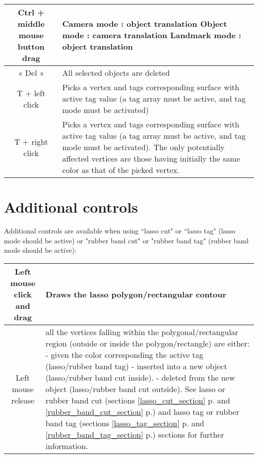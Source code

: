 \begin{tabularx}{\linewidth}{ | c | X | }
Ctrl + middle mouse button drag 
& Camera mode : object translation\newline
Object mode : camera translation\newline
Landmark mode : object translation \\ \hline			

« Del » & All selected objects are deleted \\ \hline			

T + left click & Picks a vertex and tags corresponding surface with active tag value (a tag array must be active, and tag mode must be activated)  \\ \hline			
 
T + right click & Picks a vertex and tags corresponding surface with active tag value (a tag array must be active, and tag mode must be activated). The only potentially affected vertices are those having initially the same color as that of the picked vertex.   \\ \hline			

 \end{tabularx}

\section{Additional controls}
Additional controls are available when using ``lasso cut" or ``lasso tag" (lasso mode should be active) or "rubber band cut" or "rubber band tag" (rubber band mode should be active):\\
\begin{tabularx}{\linewidth}{ | c | X | }
\hline			
Left mouse click and drag & Draws the lasso polygon/rectangular contour\\ \hline			

Left mouse release &  all the vertices falling within the polygonal/rectangular region (outside or inside the polygon/rectangle) are either:\newline
- given the color corresponding the active tag (lasso/rubber band tag)\newline
- inserted into a new object (lasso/rubber band cut inside).\newline 
- deleted from the new object (lasso/rubber band cut outside).\newline 
See lasso or rubber band cut (sections \ref{lasso_cut_section} p.\pageref{lasso_cut_section} and \ref{rubber_band_cut_section} p.\pageref{rubber_band_cut_section}) and lasso tag or rubber band tag (sections \ref{lasso_tag_section} p.\pageref{lasso_tag_section} and \ref{rubber_band_tag_section} p.\pageref{rubber_band_tag_section}) sections for further information.\\ \hline	
		

\end{tabularx}


